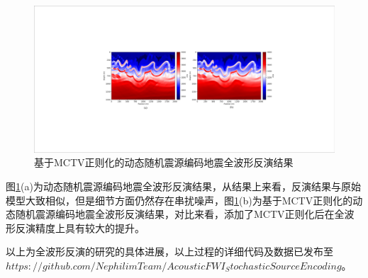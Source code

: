 \documentclass[11pt]{article}
\begin{document}
\begin{figure}[htbp]
\centering
\includegraphics[width=5.5in]{./FigureFolder/Foundation/FWI/BP1994Model.pdf}
\caption{基于MCTV正则化的动态随机震源编码地震全波形反演结果}
\label{Fig_BP1994Model}
\end{figure}
\par
图\ref{Fig_BP1994Model}(a)为动态随机震源编码地震全波形反演结果，从结果上来看，反演结果与原始模型大致相似，但是细节方面仍然存在串扰噪声，图\ref{Fig_BP1994Model}(b)为基于MCTV正则化的动态随机震源编码地震全波形反演结果，对比来看，添加了MCTV正则化后在全波形反演精度上具有较大的提升。
\par
以上为全波形反演的研究的具体进展，以上过程的详细代码及数据已发布至$https://github.com/NephilimTeam/AcousticFWI_StochasticSourceEncoding$。
\end{document}
